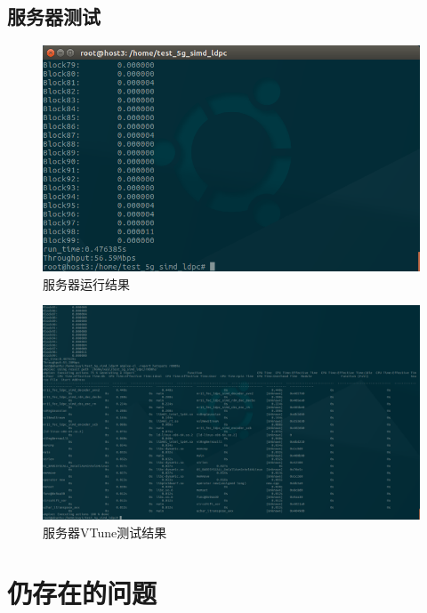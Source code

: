 \documentclass{article}
\begin{document}
\subsection{服务器测试}
\begin{figure}[H]
	\centering
	\includegraphics[width = .8\textwidth]{res.png}
	\caption{服务器运行结果}
\end{figure}
\begin{figure}[H]
	\centering
	\includegraphics[width = \textwidth]{vtune.png}
	\caption{服务器VTune测试结果}
\end{figure}


\section{仍存在的问题}


\end{document}

